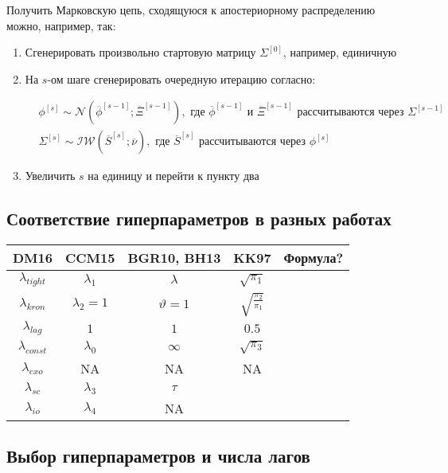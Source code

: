 \documentclass[11pt]{article} %
\newcommand{\cN}{\mathcal{N}}
\newcommand{\cIW}{\mathcal{IW}}
\newcommand{\post}{\overline}
\begin{document}
Получить Марковскую цепь, сходящуюся к апостериорному распределению можно, например, так:
\begin{enumerate}
\item Сгенерировать произвольно стартовую матрицу $\Sigma^{[0]}$, например, единичную
\item На $s$-ом шаге сгенерировать очередную итерацию согласно:

\begin{align}
&\phi^{[s]}\sim \cN(\post \phi^{[s-1]}; \post \Xi^{[s-1]}), 
\text{ где }  \post \phi^{[s-1]} \text{ и } \post \Xi^{[s-1]} \text{ рассчитываются через  } \Sigma^{[s-1]}\\
&\Sigma^{[s]} \sim \cIW(\post S^{[s]}; \post\nu), 
\text{ где } \post S^{[s]}  \text{ рассчитываются через } \phi^{[s]}
\end{align}

\item Увеличить $s$ на единицу и перейти к пункту два
\end{enumerate}




\subsection{Соответствие гиперпараметров в разных работах}


\begin{center}
\begin{tabular}{ccccc}
\toprule
DM16 &  CCM15 &  BGR10, BH13 & KK97 &Формула? \\
\midrule
$\lambda_{tight}$ & $\lambda_1$ & $\lambda$ & $\sqrt{\pi_1}$ &\\
$\lambda_{kron}$ & $\lambda_2=1$ & $\vartheta=1$ &  $\sqrt{\frac{\pi_2}{\pi_1}}$&\\
$\lambda_{lag}$ & $1$ & $1$ & $0.5$&\\
$\lambda_{const}$  & $\lambda_0$ & $\infty$ &$ \sqrt{\pi_3}$& \\
$\lambda_{exo}$ & NA & NA & NA&\\
\midrule
$\lambda_{sc}$ & $\lambda_3$ & $\tau$ && \\
$\lambda_{io}$ & $\lambda_4$ & NA && \\
\bottomrule
\end{tabular}
\end{center}




\subsection{Выбор гиперпараметров и числа лагов}
\end{document}

